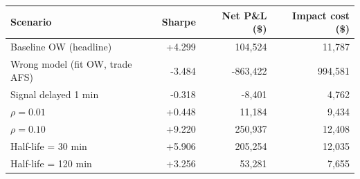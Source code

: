 \begin{tabular}{lrrr}
\toprule
Scenario & Sharpe & Net P\&L (\$) & Impact cost (\$) \\
\midrule
Baseline OW (headline) & +4.299 & 104,524 & 11,787 \\
Wrong model (fit OW, trade AFS) & -3.484 & -863,422 & 994,581 \\
Signal delayed 1 min & -0.318 & -8,401 & 4,762 \\
$\rho=0.01$ & +0.448 & 11,184 & 9,434 \\
$\rho=0.10$ & +9.220 & 250,937 & 12,408 \\
Half-life = 30 min & +5.906 & 205,254 & 12,035 \\
Half-life = 120 min & +3.256 & 53,281 & 7,655 \\
\bottomrule
\end{tabular}